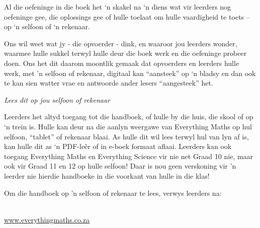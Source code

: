 {Al die oefeninge in die boek het ‘n skakel na ‘n diens wat vir leerders nog oefeninge gee, die oplossings gee of hulle toelaat om hulle vaardigheid te toets – op ‘n selfoon of ‘n rekenaar. \par

Ons wil weet wat jy - die opvoerder - dink, en waaroor jou leerders wonder, waarmee hulle sukkel terwyl hulle deur die boek werk en die oefeninge probeer doen. Ons het dit daarom moontlik gemaak dat opvoerders en leerders hulle werk, met 'n selfoon of rekenaar, digitaal kan “aansteek” op ‘n bladsy en dan ook te kan sien watter vrae en antwoorde ander lesers “aangesteek” het. \par



}




\newpage
\thispagestyle{empty}

{\normalfont\sffamily\fontsize{22}\normalfont\itshape Lees dit op jou selfoon of rekenaar} \par

{\Large


Leerders het altyd toegang tot die handboek, of hulle by die huis, die skool of op ‘n trein is. Hulle kan deur na die aanlyn weergawe van Everything Maths op hul selfoon, “tablet” of rekenaar blaai. As hulle dit wil lees terwyl hul van lyn af is, kan hulle dit as ‘n PDF-leêr of in e-boek formaat aflaai. Leerders kan ook toegang Everything Maths en Everything Science vir nie net Graad 10 nie, maar ook vir Graad 11 en 12 op hulle selfoon! Daar is nou geen verskoning vir 'n leerder nie hierdie handboeke in die voorkant van hulle in die klas!\par

Om die handboek op 'n selfoon of rekenaar te lees, verwys leerders na: 

 \\ \underline{www.everythingmaths.co.za}} \vspace*{2cm}






